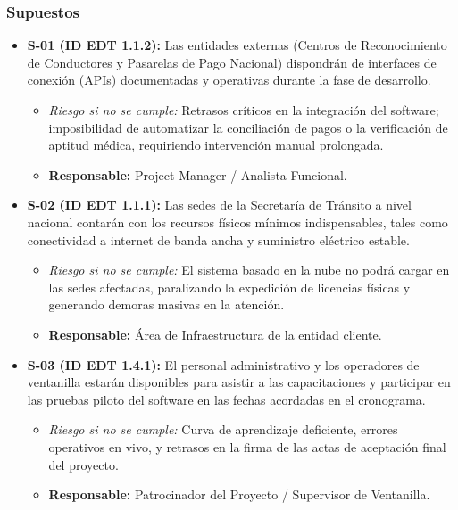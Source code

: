 \subsubsection{Supuestos}

\begin{itemize}
    \item \textbf{S-01 (ID EDT 1.1.2):} Las entidades externas (Centros de Reconocimiento de Conductores y Pasarelas de Pago Nacional) dispondrán de interfaces de conexión (APIs) documentadas y operativas durante la fase de desarrollo.
    \begin{itemize}
        \item \textit{Riesgo si no se cumple:} Retrasos críticos en la integración del software; imposibilidad de automatizar la conciliación de pagos o la verificación de aptitud médica, requiriendo intervención manual prolongada.
        \item \textbf{Responsable:} Project Manager / Analista Funcional.
    \end{itemize}

    \item \textbf{S-02 (ID EDT 1.1.1):} Las sedes de la Secretaría de Tránsito a nivel nacional contarán con los recursos físicos mínimos indispensables, tales como conectividad a internet de banda ancha y suministro eléctrico estable.
    \begin{itemize}
        \item \textit{Riesgo si no se cumple:} El sistema basado en la nube no podrá cargar en las sedes afectadas, paralizando la expedición de licencias físicas y generando demoras masivas en la atención.
        \item \textbf{Responsable:} Área de Infraestructura de la entidad cliente.
    \end{itemize}

    \item \textbf{S-03 (ID EDT 1.4.1):} El personal administrativo y los operadores de ventanilla estarán disponibles para asistir a las capacitaciones y participar en las pruebas piloto del software en las fechas acordadas en el cronograma.
    \begin{itemize}
        \item \textit{Riesgo si no se cumple:} Curva de aprendizaje deficiente, errores operativos en vivo, y retrasos en la firma de las actas de aceptación final del proyecto.
        \item \textbf{Responsable:} Patrocinador del Proyecto / Supervisor de Ventanilla.
    \end{itemize}
\end{itemize}
